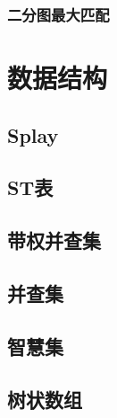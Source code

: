 \documentclass{article}
\begin{document}
\begin{multicols*}{2}
\subsubsection{二分图最大匹配}
\begin{small}

\end{small}

\section{数据结构}
\subsection{Splay}
\begin{small}

\end{small}

\subsection{ST表}
\begin{small}

\end{small}

\subsection{带权并查集}
\begin{small}

\end{small}

\subsection{并查集}
\begin{small}

\end{small}

\subsection{智慧集}
\begin{small}

\end{small}

\subsection{树状数组}

\end{multicols*}
\end{document}
